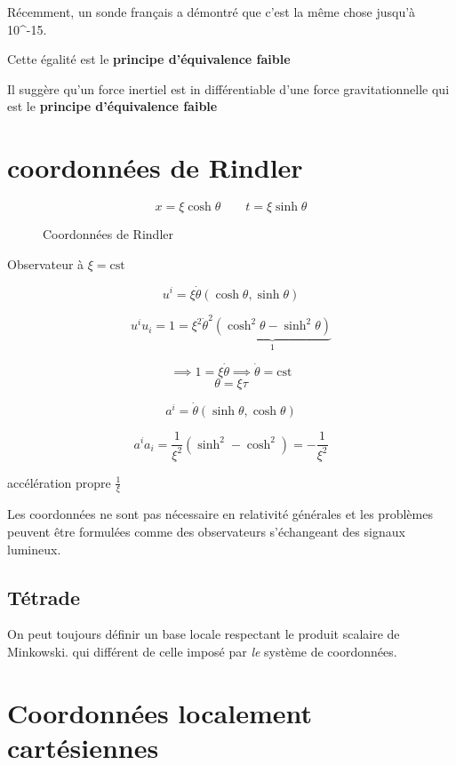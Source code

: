 Récemment, un sonde français a démontré que c'est la même chose jusqu'à 10^{-15}.

Cette égalité est le \textbf{principe d'équivalence faible}

Il suggère qu'un force inertiel est in différentiable d'une force gravitationnelle qui est le \textbf{principe d'équivalence faible}

\section*{coordonnées de Rindler}

$$x = \xi \cosh \theta \qquad t = \xi \sinh\theta $$ 


\begin{figure}[ht]
    \centering
    \caption{Coordonnées de Rindler}
    \label{fig:coordonnées-de-rindler}
\end{figure}

Observateur à $\xi = \text{cst} $ 

$$u^{i} = \xi \dot\theta \left( \cosh \theta, \sinh\theta \right) $$ 

$$u^{i}u_i =1 = \xi^2\dot\theta^{2} \underbrace{\left( \cosh^{2}\theta- \sinh^{2}\theta \right)}_{1} $$ 

$$\implies 1 = \xi \dot \theta \implies \dot\theta = \text{cst} $$ 
$$\theta = \xi \tau$$ 


$$a^{i}= \dot \theta \left( \sinh\theta, \cosh \theta \right) $$ 

$$a^{i}a_i = \frac{1}{\xi^2} \left( \sinh^{2}-\cosh^2 \right) = - \frac{1}{\xi^2} $$ 

accélération propre $\frac{1}{\xi} $ 

\begin{tcolorbox}[title=]
	Les coordonnées ne sont pas nécessaire en relativité générales et les problèmes peuvent être formulées comme des observateurs s'échangeant des signaux lumineux. 
\end{tcolorbox}

\subsection*{Tétrade}

On peut toujours définir un base locale respectant le produit scalaire de Minkowski. qui différent de celle imposé par \textit{le} système de coordonnées. 


\section*{Coordonnées localement cartésiennes}


